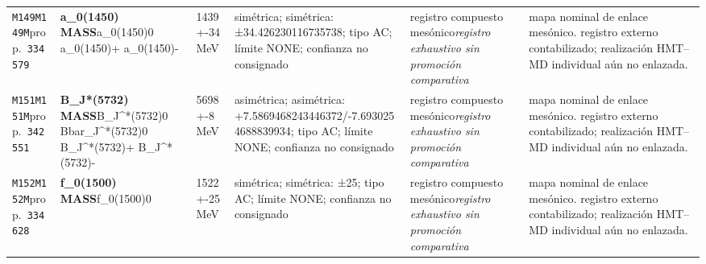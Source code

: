 \begin{landscape}
\begin{longtable}{L{1.85cm}L{4.45cm}L{2.35cm}L{4.05cm}L{3.35cm}L{7.15cm}}
\texttt{M149}\newline \texttt{M149M}\newline prop.\ \texttt{334579} & \textbf{a\_\allowbreak{}0(1450) MASS}\newline a\_\allowbreak{}0(1450)0 \textbar{}\allowbreak{} a\_\allowbreak{}0(1450)+ \textbar{}\allowbreak{} a\_\allowbreak{}0(1450)- & 1439+-34\,MeV & simétrica; simétrica: ±34.426230116735738; tipo AC; límite NONE; confianza no consignado & registro compuesto mesónico\newline \emph{registro exhaustivo sin promoción comparativa} & mapa nominal de enlace mesónico. registro externo contabilizado; realización HMT--MD individual aún no enlazada. \\
\texttt{M151}\newline \texttt{M151M}\newline prop.\ \texttt{342551} & \textbf{B\_\allowbreak{}J*(5732) MASS}\newline B\_\allowbreak{}J\textasciicircum{}*(5732)0 \textbar{}\allowbreak{} Bbar\_\allowbreak{}J\textasciicircum{}*(5732)0 \textbar{}\allowbreak{} B\_\allowbreak{}J\textasciicircum{}*(5732)+ \textbar{}\allowbreak{} B\_\allowbreak{}J\textasciicircum{}*(5732)- & 5698+-8\,MeV & asimétrica; asimétrica: +7.5869468243446372/-7.6930254688839934; tipo AC; límite NONE; confianza no consignado & registro compuesto mesónico\newline \emph{registro exhaustivo sin promoción comparativa} & mapa nominal de enlace mesónico. registro externo contabilizado; realización HMT--MD individual aún no enlazada. \\
\texttt{M152}\newline \texttt{M152M}\newline prop.\ \texttt{334628} & \textbf{f\_\allowbreak{}0(1500) MASS}\newline f\_\allowbreak{}0(1500)0 & 1522+-25\,MeV & simétrica; simétrica: ±25; tipo AC; límite NONE; confianza no consignado & registro compuesto mesónico\newline \emph{registro exhaustivo sin promoción comparativa} & mapa nominal de enlace mesónico. registro externo contabilizado; realización HMT--MD individual aún no enlazada. \\

\end{longtable}
\end{landscape}
